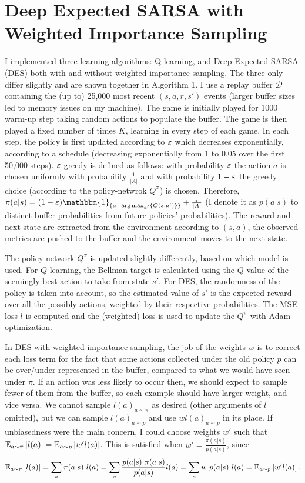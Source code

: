 \documentclass{article}
\begin{document}
\section{Deep Expected SARSA with Weighted Importance Sampling}
I implemented three learning algorithms: Q-learning, and Deep Expected SARSA (DES) both with and without weighted importance sampling. The three only differ slightly and are shown together in Algorithm 1.
I use a replay buffer \(\mathcal{D}\) containing the (up to) 25,000 most recent \((s, a, r, s')\) events (larger buffer sizes led to memory issues on my machine). The game is initially played for 1000 warm-up step taking random actions to populate the buffer. The game is then played a fixed number of times \(K\), learning in every step of each game. In each step, the policy is first updated according to \(\varepsilon\) which decreases exponentially, according to a schedule (decreasing exponentially from 1 to 0.05 over the first 50,000 steps). \(\varepsilon\)-greedy is defined as follows: with probability \(\varepsilon\) the action \(a\) is chosen uniformly with probability \(\frac{1}{|A|}\) and with probability \(1-\varepsilon\) the greedy choice (according to the policy-netwrok \(Q^\pi\)) is chosen. Therefore, \(\pi(a|s) = (1 - \eps) \mathbbm{1}_{\set{a = \arg\max_{a'}\set{Q(s,a')}}} + \frac{\eps}{|A|}\) (I denote it as \(p(a|s)\) to distinct buffer-probabilities from future policies' probabilities). The reward and next state are extracted from the environment according to \((s,a)\), the observed metrics are pushed to the buffer and the environment moves to the next state.

The policy-network \(Q^\pi\) is updated slightly differently, based on which model is used. For \(Q\)-learning, the Bellman target is calculated using the \(Q\)-value of the seemingly best action to take from state \(s'\). For DES, the randomness of the policy is taken into account, so the estimated value of \(s'\) is the expected reward over all the possibly actions, weighted by their respective probabilities. The MSE loss \(l\) is computed and the (weighted) loss is used to update the \(Q^\pi\) with Adam optimization.

In DES with weighted importance sampling, the job of the weights \(w\) is to correct each loss term for the fact that some actions collected under the old policy \(p\) can be over/under-represented in the buffer, compared to what we would have seen under \(\pi\). If an action was less likely to occur then, we should expect to sample fewer of them from the buffer, so each example should have larger weight, and vice versa. We cannot sample \(l(a)_{a \sim \pi}\) as desired (other arguments of \(l\) omitted), but we can sample \(l(a)_{a \sim p}\) and use \(w l(a)_{a \sim p}\) in its place. If unbiasedness were the main concern, I could choose weights \(w'\) such that \(\mathbb{E}_{a \sim \pi} \left[ l(a) \right] = \mathbb{E}_{a \sim p} \left[ w' l(a) \right]\). This is satisfied when \(w' = \frac{\pi(a|s)}{p(a|s)}\), since
\[
    \mathbb{E}_{a \sim \pi}\left[ l(a) \right]
    = \sum_{a} {\pi(a|s) \ l(a)}
    = \sum_{a} {\frac{p(a|s) \ \pi(a|s)}{p(a|s)} l(a)}
    = \sum_{a} {w \ p(a|s) \ l(a)}
    = \mathbb{E}_{a \sim p} \left[ w' l(a) \right].
\]
\end{document}

